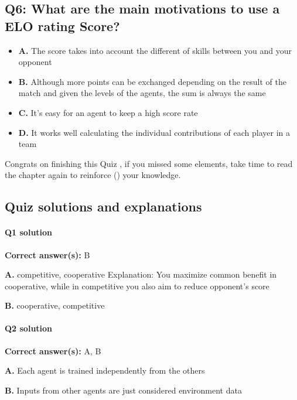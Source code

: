 \documentclass[11pt,a4paper]{article}
\begin{document}
\subsection{Q6: What are the main motivations to use a ELO rating Score?}\label{q6-what-are-the-main-motivations-to-use-a-elo-rating-score}

\begin{itemize}
\tightlist
\item
  \textbf{A.} The score takes into account the different of skills between you and your opponent
\item
  \textbf{B.} Although more points can be exchanged depending on the result of the match and given the levels of the agents, the sum is always the same
\item
  \textbf{C.} It's easy for an agent to keep a high score rate
\item
  \textbf{D.} It works well calculating the individual contributions of each player in a team
\end{itemize}

Congrats on finishing this Quiz , if you missed some elements, take time to read the chapter again to reinforce () your knowledge.

\subsection{Quiz solutions and explanations}\label{quiz-solutions-and-explanations}

\paragraph{Q1 solution}

\textbf{Correct answer(s):} B

\textbf{A.} competitive, cooperative Explanation: You maximize common benefit in cooperative, while in competitive you also aim to reduce opponent's score

\textbf{B.} cooperative, competitive

\paragraph{Q2 solution}

\textbf{Correct answer(s):} A, B

\textbf{A.} Each agent is trained independently from the others

\textbf{B.} Inputs from other agents are just considered environment data
\end{document}
